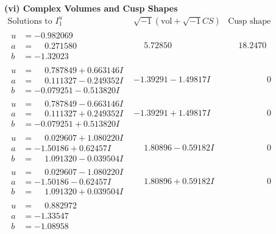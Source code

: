 \documentclass[1p]{elsarticle_modified}
\theoremstyle{definition}
\newcommand{\I}{\sqrt{-1}}
\begin{document}
\newpage\flushleft \textbf{(vi) Complex Volumes and Cusp Shapes}
$$\begin{array}{c|c|c}  
\text{Solutions to }I^u_{1}& \I (\text{vol} + \sqrt{-1}CS) & \text{Cusp shape}\\
 \hline 
\begin{aligned}
u &= -0.982069\phantom{ +0.000000I} \\
a &= \phantom{-}0.271580\phantom{ +0.000000I} \\
b &= -1.32023\phantom{ +0.000000I}\end{aligned}
 & \phantom{-}5.72850\phantom{ +0.000000I} & \phantom{-}18.2470\phantom{ +0.000000I} \\ \hline\begin{aligned}
u &= \phantom{-}0.787849 + 0.663146 I \\
a &= \phantom{-}0.111327 - 0.249352 I \\
b &= -0.079251 - 0.513820 I\end{aligned}
 & -1.39291 - 1.49817 I & \phantom{-0.000000 } 0 \\ \hline\begin{aligned}
u &= \phantom{-}0.787849 - 0.663146 I \\
a &= \phantom{-}0.111327 + 0.249352 I \\
b &= -0.079251 + 0.513820 I\end{aligned}
 & -1.39291 + 1.49817 I & \phantom{-0.000000 } 0 \\ \hline\begin{aligned}
u &= \phantom{-}0.029607 + 1.080220 I \\
a &= -1.50186 + 0.62457 I \\
b &= \phantom{-}1.091320 - 0.039504 I\end{aligned}
 & \phantom{-}1.80896 - 0.59182 I & \phantom{-0.000000 } 0 \\ \hline\begin{aligned}
u &= \phantom{-}0.029607 - 1.080220 I \\
a &= -1.50186 - 0.62457 I \\
b &= \phantom{-}1.091320 + 0.039504 I\end{aligned}
 & \phantom{-}1.80896 + 0.59182 I & \phantom{-0.000000 } 0 \\ \hline\begin{aligned}
u &= \phantom{-}0.882972\phantom{ +0.000000I} \\
a &= -1.33547\phantom{ +0.000000I} \\
b &= -1.08958\phantom{ +0.000000I}\end{aligned}

\end{array}$$
\end{document}
